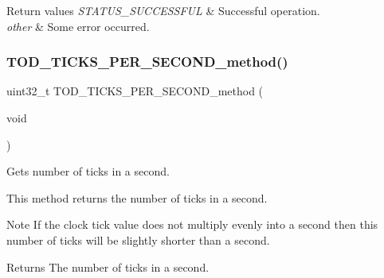 \begin{DoxyRetVals}{Return values}
{\em S\+T\+A\+T\+U\+S\+\_\+\+S\+U\+C\+C\+E\+S\+S\+F\+UL} & Successful operation. \\
\hline
{\em other} & Some error occurred. \\
\hline
\end{DoxyRetVals}
\mbox{\label{group__RTEMSScoreTOD_ga8bcb0f19ff76e742900cc90ebe6a49bd}} 
\subsubsection{\texorpdfstring{TOD\_TICKS\_PER\_SECOND\_method()}{TOD\_TICKS\_PER\_SECOND\_method()}}
{\footnotesize\ttfamily uint32\+\_\+t T\+O\+D\+\_\+\+T\+I\+C\+K\+S\+\_\+\+P\+E\+R\+\_\+\+S\+E\+C\+O\+N\+D\+\_\+method (\begin{DoxyParamCaption}\item[{void}]{ }\end{DoxyParamCaption})}



Gets number of ticks in a second. 

This method returns the number of ticks in a second.

\begin{DoxyNote}{Note}
If the clock tick value does not multiply evenly into a second then this number of ticks will be slightly shorter than a second.
\end{DoxyNote}
\begin{DoxyReturn}{Returns}
The number of ticks in a second. 
\end{DoxyReturn}
